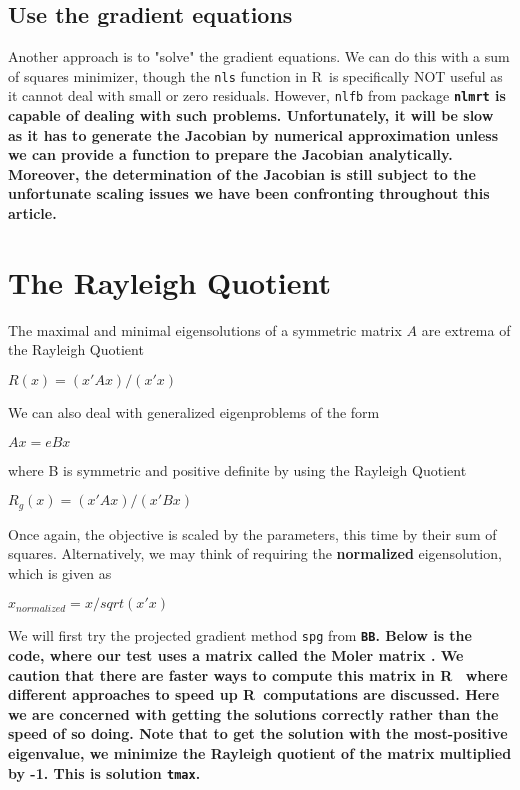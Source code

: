 \documentclass[11pt]{article}\usepackage[]{graphicx}\usepackage[]{color}
\newcommand{\B}[1]{{\bf #1 \rm}}
\newcommand{\R}{{\sf R}}
\newcommand{\code}[1]{{\tt#1}}
\newcommand{\pkg}[1]{\bf{\tt#1}\rm }
\begin{document}
\subsection{Use the gradient equations}

Another approach is to "solve" the gradient equations. We can do this with 
a sum of squares minimizer, though the \code{nls} function in \R\ is 
specifically NOT useful as it cannot deal
with small or zero residuals. However, \code{nlfb} 
from package \pkg{nlmrt} is capable of dealing
with such problems. Unfortunately, it will be slow as it has to 
generate the Jacobian by numerical
approximation unless we can provide a function to prepare the 
Jacobian analytically. Moreover,
the determination of the Jacobian is still subject to 
the unfortunate scaling issues we have
been confronting throughout this article.


\section{The Rayleigh Quotient}

The maximal and minimal eigensolutions of a symmetric matrix $A$ are extrema of the Rayleigh Quotient

$ R(x) =  (x' A x)  / (x' x) $

We can also deal with generalized eigenproblems of the form 

$A x = e B x$

where B is symmetric and positive definite by using the Rayleigh Quotient

$ R_g(x) =  (x' A x)  / (x' B x) $


Once again, the objective is scaled by the parameters, this time by their 
sum of squares. Alternatively, 
we may think of requiring the \B{normalized} eigensolution, which is given as 

$ x_{normalized} = x/sqrt(x' x) $

We will first try the projected gradient method \code{spg} from \pkg{BB}. 
Below is the code, where our test uses
a matrix called the Moler matrix \cite[Appendix 1]{cnm79}. We caution that there
are faster ways to compute this matrix in \R\ \citep{RQtimes12} where different
approaches to speed up \R\ computations are discussed. Here we are concerned 
with getting the solutions correctly rather than the speed of so doing. Note
that to get the solution with the most-positive eigenvalue, we minimize the
Rayleigh quotient of the matrix multiplied by -1. This is solution \code{tmax}.
\end{document}
